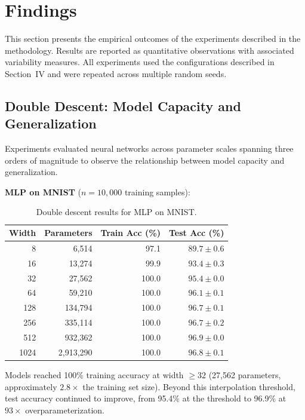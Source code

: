 \documentclass[conference]{IEEEtran}
\begin{document}
\section{Findings}

This section presents the empirical outcomes of the experiments described in the methodology. Results are reported as quantitative observations with associated variability measures. All experiments used the configurations described in Section~IV and were repeated across multiple random seeds.

\subsection{Double Descent: Model Capacity and Generalization}

Experiments evaluated neural networks across parameter scales spanning three orders of magnitude to observe the relationship between model capacity and generalization.

\textbf{MLP on MNIST} ($n = 10{,}000$ training samples):

\begin{table}[htbp]
\centering
\caption{Double descent results for MLP on MNIST.}
\label{tab:dd_mnist}
\begin{tabular}{@{}rrrr@{}}
\toprule
Width & Parameters & Train Acc (\%) & Test Acc (\%) \\
\midrule
8     & 6,514      & 97.1           & $89.7 \pm 0.6$ \\
16    & 13,274     & 99.9           & $93.4 \pm 0.3$ \\
32    & 27,562     & 100.0          & $95.4 \pm 0.0$ \\
64    & 59,210     & 100.0          & $96.1 \pm 0.1$ \\
128   & 134,794    & 100.0          & $96.7 \pm 0.1$ \\
256   & 335,114    & 100.0          & $96.7 \pm 0.2$ \\
512   & 932,362    & 100.0          & $96.9 \pm 0.0$ \\
1024  & 2,913,290  & 100.0          & $96.8 \pm 0.1$ \\
\bottomrule
\end{tabular}
\end{table}

Models reached 100\% training accuracy at width $\geq 32$ (27,562 parameters, approximately $2.8\times$ the training set size). Beyond this interpolation threshold, test accuracy continued to improve, from 95.4\% at the threshold to 96.9\% at $93\times$ overparameterization.
\end{document}
